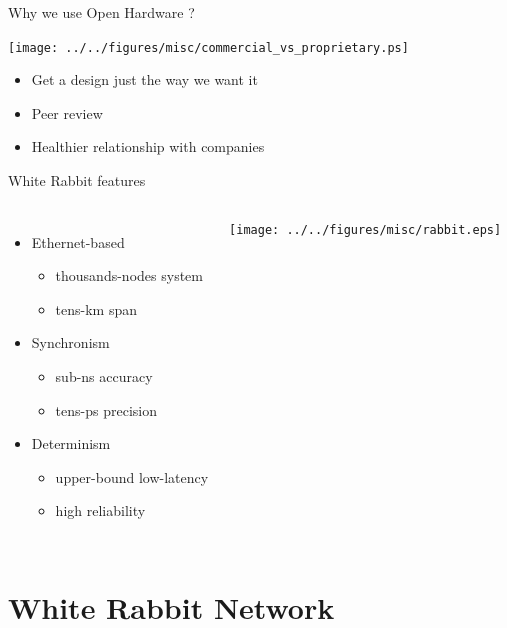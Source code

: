 \documentclass[compress,red]{beamer}
\begin{document}
\begin{frame}{Why we use Open Hardware ?}
  \begin{center}
    \texttt{[image: ../../figures/misc/commercial\_vs\_proprietary.ps]}
  \end{center}
  \begin{itemize}
    \item Get a design just the way we want it
    \item Peer review
    \item Healthier relationship with companies
  \end{itemize}
\end{frame}
\begin{frame}{White Rabbit features}

\begin{columns}[c]
	  \begin{itemize}
		  \item Ethernet-based
        \begin{itemize}
		      \item thousands-nodes system
		      \item tens-km span
        \end{itemize}
      \item Synchronism
        \begin{itemize}
		      \item sub-ns accuracy
		      \item tens-ps precision
        \end{itemize}
      \item Determinism
        \begin{itemize}
		      \item upper-bound low-latency
		      \item high reliability
        \end{itemize}
	  \end{itemize}
		\begin{center}
		\texttt{[image: ../../figures/misc/rabbit.eps]}
		\end{center}
	\end{columns}

\end{frame}

\section[WR Network]{White Rabbit Network}
\end{document}
